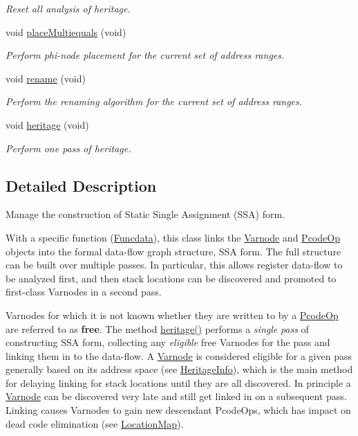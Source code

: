 \begin{DoxyCompactItemize}
\begin{DoxyCompactList}\small\item\em Reset all analysis of heritage. \end{DoxyCompactList}\item 
void \mbox{\hyperlink{class_heritage_acf14995e58b23df915ad06e9ff7f1165}{place\+Multiequals}} (void)
\begin{DoxyCompactList}\small\item\em Perform phi-\/node placement for the current set of address ranges. \end{DoxyCompactList}\item 
void \mbox{\hyperlink{class_heritage_a68d25aa348dd9e8c5f13d708b2310772}{rename}} (void)
\begin{DoxyCompactList}\small\item\em Perform the renaming algorithm for the current set of address ranges. \end{DoxyCompactList}\item 
void \mbox{\hyperlink{class_heritage_ad710084ce475a863e5d5d800300e3fd8}{heritage}} (void)
\begin{DoxyCompactList}\small\item\em Perform one pass of heritage. \end{DoxyCompactList}\end{DoxyCompactItemize}


\subsection{Detailed Description}
Manage the construction of Static Single Assignment (S\+SA) form. 

With a specific function (\mbox{\hyperlink{class_funcdata}{Funcdata}}), this class links the \mbox{\hyperlink{class_varnode}{Varnode}} and \mbox{\hyperlink{class_pcode_op}{Pcode\+Op}} objects into the formal data-\/flow graph structure, S\+SA form. The full structure can be built over multiple passes. In particular, this allows register data-\/flow to be analyzed first, and then stack locations can be discovered and promoted to first-\/class Varnodes in a second pass.

Varnodes for which it is not known whether they are written to by a \mbox{\hyperlink{class_pcode_op}{Pcode\+Op}} are referred to as {\bfseries{free}}. The method \mbox{\hyperlink{class_heritage_ad710084ce475a863e5d5d800300e3fd8}{heritage()}} performs a {\itshape single} {\itshape pass} of constructing S\+SA form, collecting any {\itshape eligible} free Varnodes for the pass and linking them in to the data-\/flow. A \mbox{\hyperlink{class_varnode}{Varnode}} is considered eligible for a given pass generally based on its address space (see \mbox{\hyperlink{class_heritage_info}{Heritage\+Info}}), which is the main method for delaying linking for stack locations until they are all discovered. In principle a \mbox{\hyperlink{class_varnode}{Varnode}} can be discovered very late and still get linked in on a subsequent pass. Linking causes Varnodes to gain new descendant Pcode\+Ops, which has impact on dead code elimination (see \mbox{\hyperlink{class_location_map}{Location\+Map}}).

